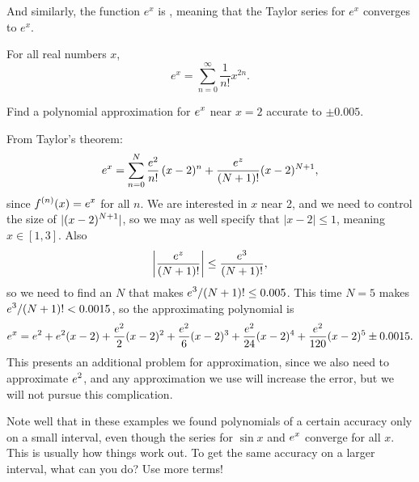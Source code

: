And similarly, the function $e^x$ is ,
meaning that the Taylor series for $e^x$ converges to $e^x$.
\begin{theorem}\label{thm:exp-is-analytic}
  For all real numbers $x$,
  $$
  e^x = \sum_{n=0}^\infty \frac{1}{n!} x^{2n}.
  $$  
\end{theorem}


\begin{example} Find a polynomial approximation for $\displaystyle e^x$ near $x=2$
accurate to $\pm
0.005$. 
\end{example}
\begin{solution}
From Taylor's theorem:
$$
  e^x= \sum_{n=0}^N{e^2\over n!}\,(x-2)^n + 
  {e^z\over (N+1)!}(x-2)^{N+1},
$$
since $\displaystyle f^{(n)}(x)=e^x$ for all $n$. We are interested in $x$ near
2, and we need to control the size of $\displaystyle |(x-2)^{N+1}|$, so we may
as well specify that $|x-2|\le 1$, meaning $x\in[1,3]$.  Also
$$\left|{e^z\over (N+1)!}\right|\le {e^3\over (N+1)!},$$
so we need to find an $N$ that makes $\displaystyle e^3/(N+1)!\le 0.005$. This time
$N=5$ makes $\displaystyle e^3/(N+1)!< 0.0015$, so the approximating polynomial is
$$
  e^x=e^2+e^2(x-2)+{e^2\over2}(x-2)^2+{e^2\over6}(x-2)^3+
  {e^2\over24}(x-2)^4+{e^2\over120}(x-2)^5
  \pm 0.0015.
$$
This presents an additional problem for approximation, since we also
need to approximate $\displaystyle e^2$, and any approximation we use will increase
the error, but we will not pursue this complication.
\end{solution}

Note well that in these examples we found polynomials of a certain
accuracy only on a small interval, even though the series for $\sin x$
and $\displaystyle e^x$ converge for all $x$.  This is usually how things work
out.  To get the same accuracy on a larger interval, what can you do?
Use more terms!

